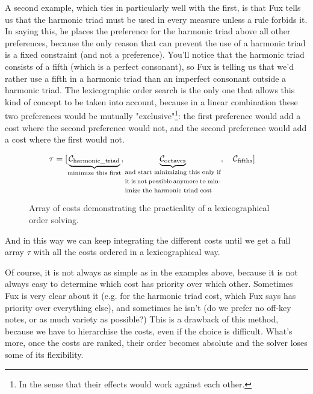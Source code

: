 A second example, which ties in particularly well with the first, is that Fux tells us that the harmonic triad must be used in every measure unless a rule forbids it. In saying this, he places the preference for the harmonic triad above all other preferences, because the only reason that can prevent the use of a harmonic triad is a fixed constraint (and not a preference). You'll notice that the harmonic triad consists of a fifth (which is a perfect consonant), so Fux is telling us that we'd rather use a fifth in a harmonic triad than an imperfect consonant outside a harmonic triad. The lexicographic order search is the only one that allows this kind of concept to be taken into account, because in a linear combination these two preferences would be mutually "exclusive"\footnote{In the sense that their effects would work against each other.}: the first preference would add a cost where the second preference would not, and the second preference would add a cost where the first would not.

\begin{figure}[h]
    \begin{equation}
        \begin{aligned}
            \tau = [& \underset{\text{\fontsize{7}{11}\selectfont{minimize this first}}}{\underbrace{\mathcal{C}_\text{harmonic\_triad}}}, \underset{\text{\fontsize{7}{11}\selectfont\parbox{4cm}{and start minimizing this only if it is not possible anymore to minimize the harmonic triad cost}}}{\underbrace{\mathcal{C}_\text{octaves}}},\quad  \mathcal{C}_\text{fifths}]
        \end{aligned}
    \end{equation}
    \caption{Array of costs demonstrating the practicality of a lexicographical order solving.}
\end{figure}

And in this way we can keep integrating the different costs until we get a full array $\tau$ with all the costs ordered in a lexicographical way.


Of course, it is not always as simple as in the examples above, because it is not always easy to determine which cost has priority over which other. Sometimes Fux is very clear about it (e.g. for the harmonic triad cost, which Fux says has priority over everything else), and sometimes he isn't (do we prefer no off-key notes, or as much variety as possible?) This is a drawback of this method, because we have to hierarchise the costs, even if the choice is difficult. What's more, once the costs are ranked, their order becomes absolute and the solver loses some of its flexibility.


